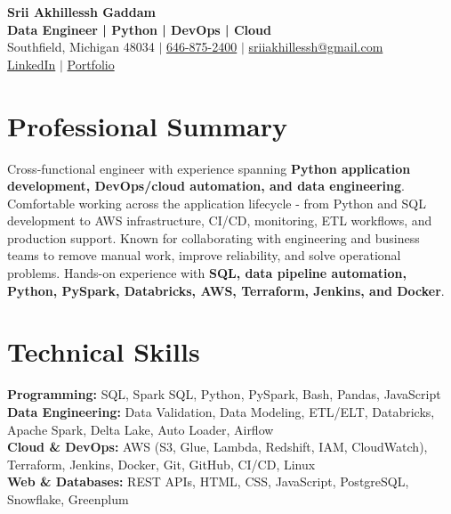 \documentclass[letterpaper,10pt]{article}
\begin{document}
\fontsize{9.35pt}{10.45pt}\selectfont

\begin{center}
    {\LARGE \textbf{Srii Akhillessh Gaddam}} \\[-1pt]
    \textbf{Data Engineer | Python | DevOps | Cloud} \\[2pt]
    Southfield, Michigan 48034 $|$
    \href{tel:6468752400}{646-875-2400} $|$
    \href{mailto:sriiakhillessh@gmail.com}{sriiakhillessh@gmail.com} \\[1pt]
    \href{https://www.linkedin.com/in/srii-akhiilessh-gaddam-b48668191/}{LinkedIn} $|$
    \href{https://sriiakhillesshg.github.io/portfolio/}{Portfolio}
\end{center}
\vspace{-8pt}

\section{Professional Summary}
\small{Cross-functional engineer with experience spanning \textbf{Python application development, DevOps/cloud automation, and data engineering}. Comfortable working across the application lifecycle - from Python and SQL development to AWS infrastructure, CI/CD, monitoring, ETL workflows, and production support. Known for collaborating with engineering and business teams to remove manual work, improve reliability, and solve operational problems. Hands-on experience with \textbf{SQL, data pipeline automation, Python, PySpark, Databricks, AWS, Terraform, Jenkins, and Docker}.}

\section{Technical Skills}
\small{
\textbf{Programming:} SQL, Spark SQL, Python, PySpark, Bash, Pandas, JavaScript \\
\textbf{Data Engineering:} Data Validation, Data Modeling, ETL/ELT, Databricks, Apache Spark, Delta Lake, Auto Loader, Airflow \\
\textbf{Cloud \& DevOps:} AWS (S3, Glue, Lambda, Redshift, IAM, CloudWatch), Terraform, Jenkins, Docker, Git, GitHub, CI/CD, Linux \\
\textbf{Web \& Databases:} REST APIs, HTML, CSS, JavaScript, PostgreSQL, Snowflake, Greenplum
}

\end{document}
